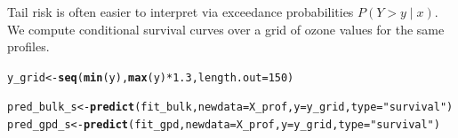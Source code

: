 \documentclass[article]{jss}\usepackage[]{graphicx}\usepackage[]{xcolor}
\makeatletter
\newcommand{\hlnum}[1]{\textcolor[rgb]{0.686,0.059,0.569}{#1}}%
\newcommand{\hlsng}[1]{\textcolor[rgb]{0.192,0.494,0.8}{#1}}%
\newcommand{\hlopt}[1]{\textcolor[rgb]{0,0,0}{#1}}%
\newcommand{\hldef}[1]{\textcolor[rgb]{0.345,0.345,0.345}{#1}}%
\newcommand{\hlkwb}[1]{\textcolor[rgb]{0.69,0.353,0.396}{#1}}%
\newcommand{\hlkwc}[1]{\textcolor[rgb]{0.333,0.667,0.333}{#1}}%
\newcommand{\hlkwd}[1]{\textcolor[rgb]{0.737,0.353,0.396}{\textbf{#1}}}%
\newenvironment{kframe}{%
 \def\at@end@of@kframe{}%
 \ifinner\ifhmode%
  \def\at@end@of@kframe{\end{minipage}}%
  \begin{minipage}{\columnwidth}%
 \fi\fi%
 \def\FrameCommand##1{\hskip\@totalleftmargin \hskip-\fboxsep
 \colorbox{shadecolor}{##1}\hskip-\fboxsep
     \hskip-\linewidth \hskip-\@totalleftmargin \hskip\columnwidth}%
 \MakeFramed {\advance\hsize-\width
   \@totalleftmargin\z@ \linewidth\hsize
   \@setminipage}}%
 {\par\unskip\endMakeFramed%
 \at@end@of@kframe}
\newenvironment{knitrout}{}{} %
\makeatother
\begin{document}
Tail risk is often easier to interpret via exceedance probabilities $P(Y>y \mid x)$.
We compute conditional survival curves over a grid of ozone values for the same profiles.

\begin{knitrout}
\color{fgcolor}\begin{kframe}
\begin{alltt}
\hldef{y_grid} \hlkwb{<-} \hlkwd{seq}\hldef{(}\hlkwd{min}\hldef{(y),} \hlkwd{max}\hldef{(y)} \hlopt{*} \hlnum{1.3}\hldef{,} \hlkwc{length.out} \hldef{=} \hlnum{150}\hldef{)}

\hldef{pred_bulk_s} \hlkwb{<-} \hlkwd{predict}\hldef{(fit_bulk,} \hlkwc{newdata} \hldef{= X_prof,} \hlkwc{y} \hldef{= y_grid,} \hlkwc{type} \hldef{=} \hlsng{"survival"}\hldef{)}
\hldef{pred_gpd_s}  \hlkwb{<-} \hlkwd{predict}\hldef{(fit_gpd,}  \hlkwc{newdata} \hldef{= X_prof,} \hlkwc{y} \hldef{= y_grid,} \hlkwc{type} \hldef{=} \hlsng{"survival"}\hldef{)}


\end{alltt}
\end{kframe}
\end{knitrout}
\end{document}
